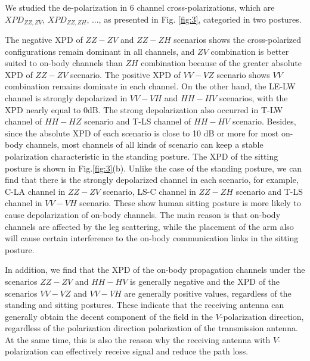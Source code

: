 \documentclass[conference]{IEEEtran}
\begin{document}
We studied the de-polarization in 6 channel cross-polarizations, which are $XPD_{ZZ,ZV}$, $XPD_{ZZ,ZH}$, ..., as presented in Fig. \ref{fig:3}, categoried in two postures.

The negative XPD of $ZZ-ZV$ and $ZZ-ZH$ scenarios shows the cross-polarized configurations remain dominant in all channels, and $ZV$ combination is better suited to on-body channels than $ZH$ combination because of the greater absolute XPD of $ZZ-ZV$ scenario. The positive XPD of $VV-VZ$ scenario shows $VV$ combination remains dominate in each channel. On the other hand, the LE-LW channel is strongly depolarized in $VV-VH$ and $HH-HV$ scenarios, with the XPD nearly equal to 0dB. The strong depolarization also occurred in T-LW channel of $HH-HZ$ scenario and T-LS channel of $HH-HV$ scenario. Besides, since the absolute XPD of each scenario is close to 10 dB or more for most on-body channels, most channels of all kinds of scenario can keep a stable polarization characteristic in the standing posture. The XPD of the sitting posture is shown in Fig.\ref{fig:3}(b). Unlike the case of  the standing posture, we can find that there is the strongly depolarized channel in each scenario, for example, C-LA channel in $ZZ-ZV$ scenario, LS-C channel in $ZZ-ZH$ scenario and T-LS channel in $VV-VH$ scenario. These show human sitting posture is more likely to cause depolarization of on-body channels. The main reason is that on-body channels are affected by the leg scattering, while the placement of the arm also will cause certain interference to the on-body communication links in the sitting posture.

In addition, we find that the XPD of the on-body propagation channels under the scenarios $ZZ-ZV$ and $HH-HV$ is generally negative and the XPD of the scenarios $VV-VZ$ and $VV-VH$ are generally positive values, regardless of the standing and sitting postures. These indicate that the receiving antenna can generally obtain the decent component of the field in the $V$-polarization direction, regardless of the polarization direction polarization of the transmission antenna. At the same time, this is also the reason why the receiving antenna with $V$-polarization can effectively receive signal and reduce the path loss.
\end{document}
